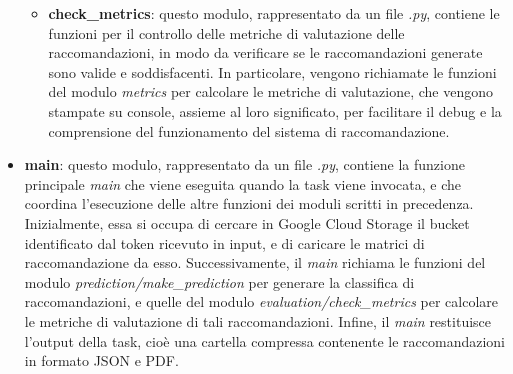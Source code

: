 \begin{itemize}
\begin{itemize}
        \item \textbf{check\_metrics}: questo modulo, rappresentato da un file \emph{.py}, contiene le funzioni per il controllo delle metriche di valutazione delle raccomandazioni, in modo da verificare se le raccomandazioni generate sono valide e soddisfacenti. In particolare, vengono richiamate le funzioni del modulo \emph{metrics} per calcolare le metriche di valutazione, che vengono stampate su console, assieme al loro significato, per facilitare il debug e la comprensione del funzionamento del sistema di raccomandazione.
    \end{itemize}
    \item \textbf{main}: questo modulo, rappresentato da un file \emph{.py}, contiene la funzione principale \emph{main} che viene eseguita quando la task viene invocata, e che coordina l'esecuzione delle altre funzioni dei moduli scritti in precedenza. Inizialmente, essa si occupa di cercare in Google Cloud Storage il bucket identificato dal token ricevuto in input, e di caricare le matrici di raccomandazione da esso. Successivamente, il \emph{main} richiama le funzioni del modulo \emph{prediction/make\_prediction} per generare la classifica di raccomandazioni, e quelle del modulo \emph{evaluation/check\_metrics} per calcolare le metriche di valutazione di tali raccomandazioni. Infine, il \emph{main} restituisce l'output della task, cioè una cartella compressa contenente le raccomandazioni in formato JSON e PDF.
\end{itemize}

